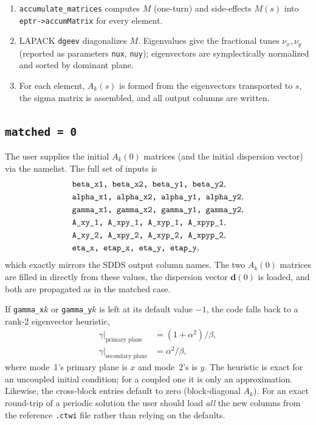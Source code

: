 \documentclass[11pt]{article}
\begin{document}
\begin{enumerate}
\item \verb|accumulate_matrices| computes $M$ (one-turn) and side-effects
      $M(s)$ into \verb|eptr->accumMatrix| for every element.
\item LAPACK \verb|dgeev| diagonalizes $M$. Eigenvalues give the fractional
      tunes $\nu_x,\nu_y$ (reported as parameters \verb|nux|, \verb|nuy|);
      eigenvectors are symplectically normalized and sorted by dominant plane.
\item For each element, $A_k(s)$ is formed from the eigenvectors transported
      to $s$, the sigma matrix is assembled, and all output columns are
      written.
\end{enumerate}

\subsection*{\texttt{matched = 0}}

The user supplies the initial $A_k(0)$ matrices (and the initial dispersion
vector) via the namelist. The full set of inputs is
\[
\begin{aligned}
&\verb|beta_x1, beta_x2, beta_y1, beta_y2|, \\
&\verb|alpha_x1, alpha_x2, alpha_y1, alpha_y2|, \\
&\verb|gamma_x1, gamma_x2, gamma_y1, gamma_y2|, \\
&\verb|A_xy_1, A_xpy_1, A_xyp_1, A_xpyp_1|, \\
&\verb|A_xy_2, A_xpy_2, A_xyp_2, A_xpyp_2|, \\
&\verb|eta_x, etap_x, eta_y, etap_y| ,
\end{aligned}
\]
which exactly mirrors the SDDS output column names. The two $A_k(0)$
matrices are filled in directly from these values, the dispersion vector
$\mathbf{d}(0)$ is loaded, and both are propagated as in the matched case.

If \verb|gamma_x|$k$ or \verb|gamma_y|$k$ is left at its default value $-1$,
the code falls back to a rank-2 eigenvector heuristic,
\begin{align*}
   \gamma\big|_{\text{primary plane}}   &= (1+\alpha^2)/\beta , \\
   \gamma\big|_{\text{secondary plane}} &= \alpha^2/\beta ,
\end{align*}
where mode~1's primary plane is $x$ and mode~2's is $y$. The heuristic is
exact for an uncoupled initial condition; for a coupled one it is only an
approximation. Likewise, the cross-block entries default to zero
(block-diagonal $A_k$). For an exact round-trip of a periodic solution the
user should load \emph{all} the new columns from the reference \verb|.ctwi|
file rather than relying on the defaults.
\end{document}
